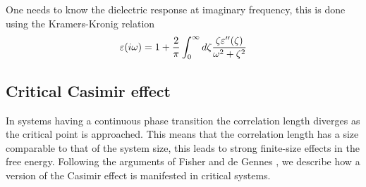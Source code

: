 One needs to know the dielectric response at imaginary frequency, this is done using the Kramers-Kronig relation
\begin{equation}
\varepsilon(i\omega)= 1 +{2\over \pi}\int_0^\infty d\zeta {\zeta \varepsilon''(\zeta)\over \omega^2 + \zeta^2}
\end{equation}


\subsection{Critical Casimir effect}

{\color{red}
In systems having a continuous phase transition the correlation length diverges as the critical point is approached. This means that the correlation length has a size comparable to that of the system size, this  leads to strong finite-size effects in the free energy. Following the arguments of Fisher and de Gennes \cite{gambassi_casimir_2009}, we describe how a version of  the Casimir effect is manifested in  critical systems. 
}
